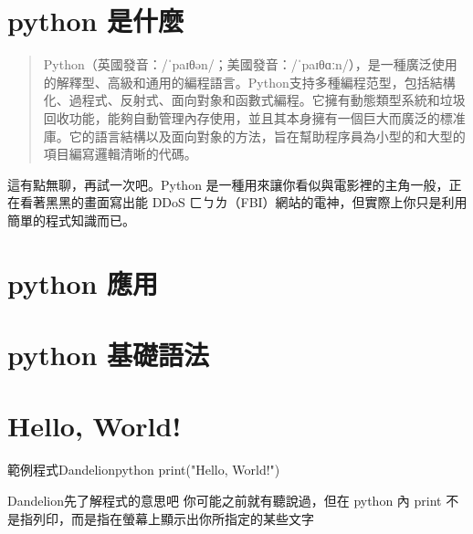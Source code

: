 \documentclass{article}
\begin{document}

\begin{large}

\section{python 是什麼}
    \begin{quote}
        Python（英國發音：/ˈpaɪθən/；美國發音：/ˈpaɪθɑːn/），是一種廣泛使用的解釋型、高級和通用的編程語言。Python支持多種編程范型，包括結構化、過程式、反射式、面向對象和函數式編程。它擁有動態類型系統和垃圾回收功能，能夠自動管理內存使用，並且其本身擁有一個巨大而廣泛的標准庫。它的語言結構以及面向對象的方法，旨在幫助程序員為小型的和大型的項目編寫邏輯清晰的代碼。
    \end{quote}
    這有點無聊，再試一次吧。Python 是一種用來讓你看似與電影裡的主角一般，正在看著黑黑的畫面寫出能
    DDoS ㄈㄅㄌ（FBI）網站的電神，但實際上你只是利用簡單的程式知識而已。
\section{python 應用}

\section{python 基礎語法}
\section{Hello, World!}
\begin{mintbox}{範例程式}{Dandelion}{python}
print("Hello, World!")
\end{mintbox}

\begin{boxpar}{Dandelion}{先了解程式的意思吧}
    你可能之前就有聽說過，但在 python 內 print 不是指列印，而是指在螢幕上顯示出你所指定的某些文字
\end{boxpar}

\end{large}
\end{document}
